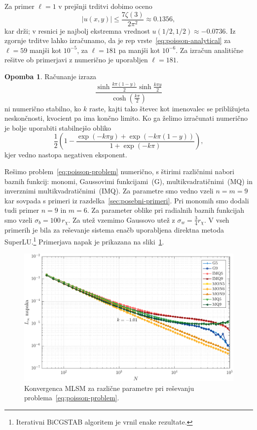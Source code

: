 \documentclass[12pt,a4paper,twoside]{article}
\theoremstyle{definition} %
\newtheorem{opomba}[definicija]{Opomba}
\theoremstyle{plain} %
\numberwithin{equation}{section}
\newlength{\iw}
\begin{document}
Za primer $\ell = 1$  v prejšnji trditvi dobimo oceno
\begin{equation}
   |u(x, y)| \leq \frac{7 \zeta(3)}{2 \pi^2} \approx 0.1356,
\end{equation}
kar drži; v resnici je najbolj ekstremna vrednost $u(1/2, 1/2) \approx -0.0736$.
Iz zgornje trditve lahko izračunamo, da je rep
vrste~\eqref{eq:poisson-analytical} za $\ell = 59$ manjši kot $10^{-5}$, za
$\ell = 181$ pa manjši kot $10^{-6}$. Za izračun analitične rešitve ob
primerjavi z numerično je uporabljen $\ell = 181$.
\begin{opomba}
  Računanje izraza
  \begin{equation}
   \frac{\sinh \frac{k \pi  (1-y)}{2} \sinh \frac{k \pi y}{2}}{\cosh(\frac{k\pi}{2})}
  \end{equation}
  ni numerično stabilno, ko $k$ raste, kajti tako števec kot imenovalec se približujeta
  neskončnosti, kvocient pa ima končno limito. Ko ga želimo izračunati numerično je bolje uporabiti
  stabilnejšo obliko
  \begin{equation}
    \frac12\left( 1 - \frac{\exp(-k\pi y) + \exp(-k\pi(1-y)) }{1 + \exp(-k\pi)}\right),
  \end{equation}
  kjer vedno nastopa negativen eksponent.
\end{opomba}

Rešimo problem~\eqref{eq:poisson-problem} numerično, s štirimi različnimi nabori baznih funkcij:
monomi, Gaussovimi funkcijami~(G), multikvadratičnimi~(MQ) in inverznimi multikvadratičnimi~(IMQ).
Za parametre smo vedno vzeli $n = m = 9$ kar sovpada s primeri iz
razdelka~\ref{sec:posebni-primeri}. Pri monomih smo dodali tudi primer $n = 9$ in $m = 6$. Za
parameter oblike pri radialnih baznih funkcijah smo vzeli $\sigma_b = 100\, r_\chi$. Za utež
vzemimo Gaussovo utež z $\sigma_w = \frac34 r_\chi$. V vseh primerih je bila za reševanje sistema
enačb uporabljena direktna metoda SuperLU.\footnote{Iterativni BiCGSTAB algoritem je vrnil enake
rezultate.} Primerjava napak je prikazana na sliki~\ref{fig:poisson-square-convergence}.

\begin{figure}[h]
  \centering
  \includegraphics[width=\iw]{images/poisson_square_convergence.pdf}
  \caption[Konvergenca MLSM pri reševanju Poissonove enačbe]{Konvergenca MLSM
  za različne parametre pri reševanju problema~\eqref{eq:poisson-problem}.}
  \label{fig:poisson-square-convergence}
\end{figure}
\end{document}
